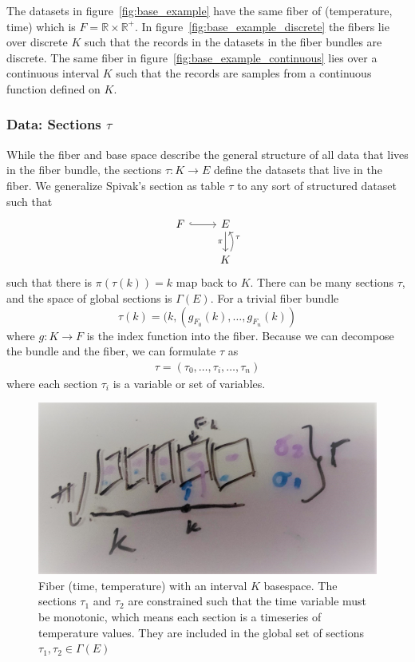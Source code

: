 \documentclass[../main.tex]{subfiles}
\begin{document}
The datasets in figure~\ref{fig:base_example} have the same fiber of (temperature, time) which is $F=\mathbb{R}\times \mathbb{R}^+$. In figure~\ref{fig:base_example_discrete} the fibers lie over discrete $K$ such that the records in the datasets in the fiber bundles are discrete. The same fiber in figure~\ref{fig:base_example_continuous} lies over a continuous interval $K$ such that the records are samples from a continuous function defined on $K$.

\subsubsection{Data: Sections $\tau$}
\label{sec:data_section}
While the fiber and base space describe the general structure of all data that lives in the fiber bundle, the sections $\tau: K\rightarrow E$ define the datasets that live in the fiber. We generalize Spivak's section as table $\tau$\cite{spivakSIMPLICIALDATABASES} to any sort of structured dataset such that 
\begin{equation}
    \begin{tikzcd}
        F \arrow[r, hook] & E \arrow[d, "\pi"']              \\
                          & K \arrow[u, "\tau"', bend right]
    \end{tikzcd}
\end{equation}
such that there is $\pi(\tau(k)) = k$ map back to $K$. There can be many sections $\tau$, and the space of global sections is $\Gamma(E)$. For a trivial fiber bundle
\begin{equation}
    \label{eq:section_return}
    \tau(k) = (k, (g_{F_{0}}(k), \ldots, g_{F_{n}}(k))
\end{equation}
where $g: K \rightarrow F$ is the index function into the fiber. Because we can decompose the bundle and the fiber, we can formulate $\tau$ as 
\begin{align}
\tau = (\tau_0,\ldots, \tau_i, \dots, \tau_n) 
\end{align}
where each section $\tau_i$ is a variable or set of variables. 

\begin{figure}[ht!]
    \includegraphics[width=.5\linewidth]{figures/math/fiberbundle.png}
    \caption{ Fiber (time, temperature) with an interval $K$ basespace. The sections $\tau_1$ and $\tau_2$ are constrained such that the time variable must be monotonic, which means each section is a timeseries of temperature values. They are included in the global set of sections  $\tau_1, \tau_2 \in \Gamma(E)$}
    \label{fig:data_sections}
\end{figure}
\end{document}
